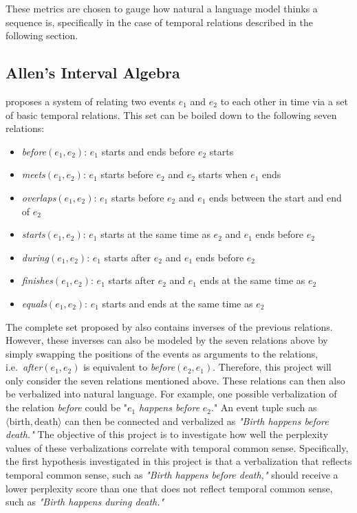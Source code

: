 \documentclass[11pt]{article}
\begin{document}
These metrics are chosen to gauge how natural a language model thinks a sequence is, specifically in the case of temporal relations described in the following section.

\subsection{Allen's Interval Algebra}
\label{sec:allen}
\citet{allen} proposes a system of relating two events $e_1$ and $e_2$ to each other in time via a set of basic temporal relations. This set can be boiled down to the following seven relations:

\begin{itemize}
  \item \textit{before}$(e_1, e_2)$: $e_1$ starts and ends before $e_2$ starts
  \item \textit{meets}$(e_1, e_2)$: $e_1$ starts before $e_2$ and $e_2$ starts when $e_1$ ends
  \item \textit{overlaps}$(e_1, e_2)$: $e_1$ starts before $e_2$ and $e_1$ ends between the start and end of $e_2$
  \item \textit{starts}$(e_1, e_2)$: $e_1$ starts at the same time as $e_2$ and $e_1$ ends before $e_2$
  \item \textit{during}$(e_1, e_2)$: $e_1$ starts after $e_2$ and $e_1$ ends before $e_2$
  \item \textit{finishes}$(e_1, e_2)$: $e_1$ starts after $e_2$ and $e_1$ ends at the same time as $e_2$
  \item \textit{equals}$(e_1, e_2)$: $e_1$ starts and ends at the same time as $e_2$
\end{itemize}

The complete set proposed by \citet{allen} also contains inverses of the previous relations. However, these inverses can also be modeled by the seven relations above by simply swapping the positions of the events as arguments to the relations, i.e.~\textit{after}$(e_1, e_2)$ is equivalent to \textit{before}$(e_2, e_1)$. Therefore, this project will only consider the seven relations mentioned above. These relations can then also be verbalized into natural language. For example, one possible verbalization of the relation \textit{before} could be "$e_1$ \textit{happens before} $e_2$." An event tuple such as $\langle \text{birth}, \text{death} \rangle$ can then be connected and verbalized as \textit{"Birth happens before death."} The objective of this project is to investigate how well the perplexity values of these verbalizations correlate with temporal common sense. Specifically, the first hypothesis investigated in this project is that a verbalization that reflects temporal common sense, such as \textit{"Birth happens before death,"} should receive a lower perplexity score than one that does not reflect temporal common sense, such as \textit{"Birth happens during death."}
\end{document}
